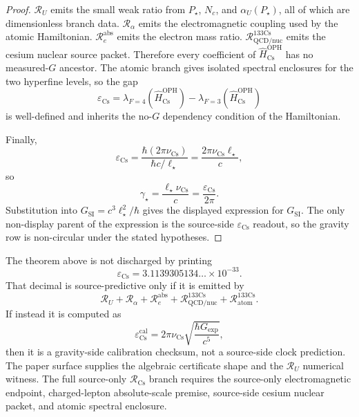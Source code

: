 \begin{proof}
\(\mathcal R_U\) emits the small weak ratio from \(P_\star\), \(N_c\), and
\(\alpha_U(P_\star)\), all of which are dimensionless branch data. \(\mathcal R_\alpha\) emits
the electromagnetic coupling used by the atomic Hamiltonian. \(\mathcal R_e^{\mathrm{abs}}\)
emits the electron mass ratio. \(\mathcal R_{\mathrm{QCD/nuc}}^{133\mathrm{Cs}}\) emits the
cesium nuclear source packet. Therefore every coefficient of
\(\widehat H_{\mathrm{Cs}}^{\mathrm{OPH}}\) has no measured-\(G\) ancestor. The atomic branch
gives isolated spectral enclosures for the two hyperfine levels, so the gap
\[
\varepsilon_{\mathrm{Cs}}
=
\lambda_{F=4}(\widehat H_{\mathrm{Cs}}^{\mathrm{OPH}})
-
\lambda_{F=3}(\widehat H_{\mathrm{Cs}}^{\mathrm{OPH}})
\]
is well-defined and inherits the no-\(G\) dependency condition of the Hamiltonian.

Finally,
\[
\varepsilon_{\mathrm{Cs}}
=
\frac{\hbar(2\pi\nu_{\mathrm{Cs}})}{\hbar c/\ell_\star}
=
\frac{2\pi\nu_{\mathrm{Cs}}\ell_\star}{c},
\]
so
\[
\gamma_\star=\frac{\ell_\star\nu_{\mathrm{Cs}}}{c}
=
\frac{\varepsilon_{\mathrm{Cs}}}{2\pi}.
\]
Substitution into \(G_{\mathrm{SI}}=c^3\ell_\star^2/\hbar\) gives the displayed expression
for \(G_{\mathrm{SI}}\). The only non-display parent of the expression is the source-side
\(\varepsilon_{\mathrm{Cs}}\) readout, so the gravity row is non-circular under the stated
hypotheses.
\end{proof}

\begin{remark}\label{rem:cs-clock-boundary}
The theorem above is not discharged by printing
\[
\varepsilon_{\mathrm{Cs}}
=
3.1139305134\ldots\times10^{-33}.
\]
That decimal is source-predictive only if it is emitted by
\[
\mathcal R_U
+
\mathcal R_\alpha
+
\mathcal R_e^{\mathrm{abs}}
+
\mathcal R_{\mathrm{QCD/nuc}}^{133\mathrm{Cs}}
+
\mathcal R_{\mathrm{atom}}^{133\mathrm{Cs}}.
\]
If instead it is computed as
\[
\varepsilon_{\mathrm{Cs}}^{\mathrm{cal}}
=
2\pi\nu_{\mathrm{Cs}}
\sqrt{\frac{\hbar G_{\mathrm{exp}}}{c^5}},
\]
then it is a gravity-side calibration checksum, not a source-side clock prediction. The paper
surface supplies the algebraic certificate shape and the \(\mathcal R_U\) numerical witness.
The full source-only \(\mathcal R_{\mathrm{Cs}}\) branch requires the source-only
electromagnetic endpoint, charged-lepton absolute-scale premise, source-side cesium nuclear packet,
and atomic spectral enclosure.
\end{remark}


